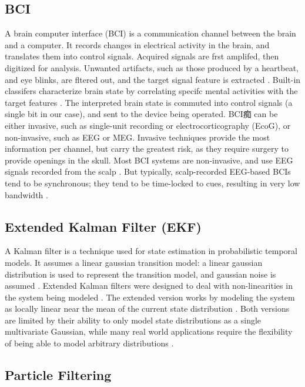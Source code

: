 \documentclass{article}
\begin{document}
\subsection{BCI}

A brain computer interface (BCI) is a communication channel between the brain and a computer. It records changes in electrical activity in the brain, and translates them into control 
signals. Acquired signals are frst amplifed, then digitized for analysis. Unwanted artifacts, such 
as those produced by a heartbeat, and eye blinks, are fltered out, and the target signal feature is 
extracted \cite{lotte_review_2007}. Built-in classifers characterize brain state by correlating specifc mental activities 
with the target features \cite{lotte_review_2007}. The interpreted brain state is commuted into control signals (a single 
bit in our case), and sent to the device being operated. 
BCI痴 can be either invasive, such as single-unit recording or electrocorticography (EcoG), or 
non-invasive, such as EEG or MEG. Invasive techniques provide the most information per channel, 
but carry the greatest risk, as they require surgery to provide openings in the skull. Most BCI 
systems are non-invasive, and use EEG signals recorded from the scalp \cite{guger_design_1999}.   But typically, scalp-recorded EEG-based BCIs tend to be synchronous; they tend to be time-locked to cues, resulting in very low bandwidth \cite{millan_non-invasive_2003}.

\subsection{Extended Kalman Filter (EKF)}

A Kalman filter is a technique used for state estimation in probabilistic temporal models.  It assumes a linear gaussian transition model: a linear gaussian distribution is used to represent the transition model, and gaussian noise is assumed \cite{russell_artificial_2002}.  Extended Kalman filters were designed to deal with non-linearities in the system being modeled \cite{russell_artificial_2002}.  The extended version works by modeling the system as locally linear near the mean of the current state distribution \cite{russell_artificial_2002}.  Both versions are limited by their ability to only model state distributions as a single multivariate Gaussian, while many real world applications require the flexibility of being able to model arbitrary distributions \cite{russell_artificial_2002}.  

\subsection{Particle Filtering}
\end{document}
